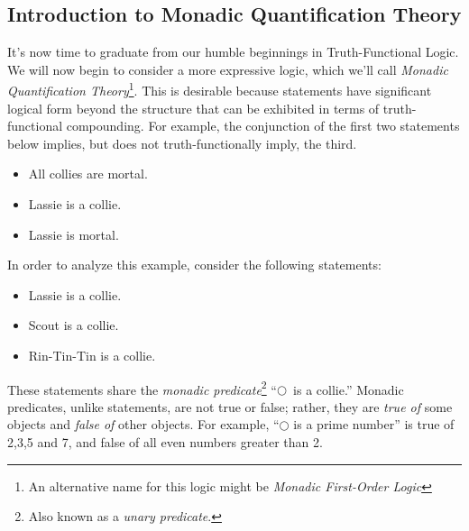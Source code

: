 \subsection{Introduction to Monadic Quantification Theory}

It's now time to graduate from our humble beginnings in Truth-Functional Logic. We will now begin to consider a more expressive logic, which we'll call \emph{Monadic Quantification Theory}\footnote{An alternative name for this logic might be \emph{Monadic First-Order Logic}}. 
This is desirable because statements have significant logical form beyond the structure that can be
exhibited in terms of truth-functional compounding. For example, the conjunction of the first two statements below implies, but does not truth-functionally imply, the third.

\begin{itemize}
\item All collies are mortal. 
\item Lassie is a collie.
\item Lassie is mortal.
\end{itemize}

In order to analyze this example, consider the following statements: 
\begin{itemize}
\item Lassie is a collie.
\item Scout is a collie.
\item Rin-Tin-Tin is a collie.
\end{itemize}

These statements share the \emph{monadic predicate}\footnote{Also known as a \emph{unary predicate}.} ``$\bigcirc$\ is a collie.''
Monadic predicates, unlike statements, are not true or false; rather, they are
\emph{true of} some objects and \emph{false of} other objects.
For example, ``$\bigcirc$ is a prime number'' is true of 2,3,5 and 7, and false of all even
numbers greater than 2.


